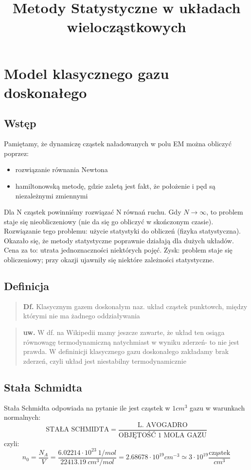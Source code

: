 
\title{Metody Statystyczne w układach wielocząstkowych}
\section{Model klasycznego gazu doskonałego}
\subsection{Wstęp}
Pamiętamy, że dynamiczę cząstek naładowanych w polu EM można obliczyć poprzez:
\begin{itemize}
\item rozwiązanie równania Newtona
\item hamiltonowską metodę, gdzie zaletą jest fakt, że położenie i pęd są niezależnymi zmiennymi
\end{itemize}
Dla N cząstek powinniśmy rozwiązać N równań ruchu. Gdy $N\rightarrow\infty$, to problem staje się nieobliczeniowy (nie da się go obliczyć w skończonym czasie).\\
Rozwiązanie tego problemu: użycie statystyki do obliczeń (fizyka statystyczna). Okazało się, że metody statystyczne poprawnie działają dla dużych układów. Cena za to: utrata jednoznaczności niektórych pojęć. Zysk: problem staje się obliczeniowy; przy okazji ujawniły się niektóre zależności statystyczne. 
\subsection{Definicja}
\begin{verse}\textbf{Df.} Klasycznym gazem doskonałym naz. układ cząstek punktowch, między którymi nie ma żadnego oddziaływania \end{verse}
\begin{verse}\textbf{uw.} W df. na Wikipedii mamy jeszcze zawarte, że układ ten osiąga równowagę termodynamiczną natychmiast w wyniku zderzeń- to nie jest prawda. W defininicji klasycznego gazu doskonałego zakładamy brak zderzeń, czyli układ jest niestabilny termodynamicznie \end{verse}
\subsection{Stała Schmidta}
Stała Schmidta odpowiada na pytanie ile jest cząstek w $1 cm^3$ gazu w warunkach normalnych:
\begin{equation}\text{STAŁA SCHMIDTA}=\frac{\text{L. AVOGADRO}}{\text{OBJĘTOŚĆ 1 MOLA GAZU}}\end{equation}
czyli:
\begin{equation}n_0=\frac{N_A}{V}=\frac{6.02214\cdot 10^{23} ~{1/mol}}{22413.19 ~cm^3/mol}=2.68678\cdot 10^{19} cm^{-3} \simeq 3\cdot 10^{19} \frac{\text{cząstek}}{cm^3}\end{equation}
